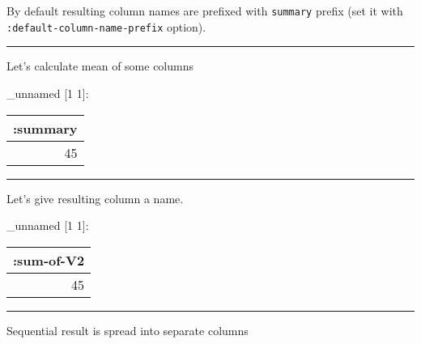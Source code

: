 \documentclass[]{article}
\newenvironment{Shaded}{\begin{snugshade}}{\end{snugshade}}
\newcommand{\KeywordTok}[1]{\textcolor[rgb]{0.13,0.29,0.53}{\textbf{#1}}}
\newcommand{\DecValTok}[1]{\textcolor[rgb]{0.00,0.00,0.81}{#1}}
\newcommand{\VariableTok}[1]{\textcolor[rgb]{0.00,0.00,0.00}{#1}}
\newcommand{\AttributeTok}[1]{\textcolor[rgb]{0.77,0.63,0.00}{#1}}
\newcommand{\NormalTok}[1]{#1}
\begin{document}
By default resulting column names are prefixed with \texttt{summary}
prefix (set it with \texttt{:default-column-name-prefix} option).

\begin{center}\rule{0.5\linewidth}{0.5pt}\end{center}

Let's calculate mean of some columns

\begin{Shaded}
\end{Shaded}

\_unnamed {[}1 1{]}:

\begin{longtable}[]{@{}r@{}}
\toprule
:summary\tabularnewline
\midrule
\endhead
45\tabularnewline
\bottomrule
\end{longtable}

\begin{center}\rule{0.5\linewidth}{0.5pt}\end{center}

Let's give resulting column a name.

\begin{Shaded}
\end{Shaded}

\_unnamed {[}1 1{]}:

\begin{longtable}[]{@{}r@{}}
\toprule
:sum-of-V2\tabularnewline
\midrule
\endhead
45\tabularnewline
\bottomrule
\end{longtable}

\begin{center}\rule{0.5\linewidth}{0.5pt}\end{center}

Sequential result is spread into separate columns

\begin{Shaded}
\end{Shaded}
\end{document}
